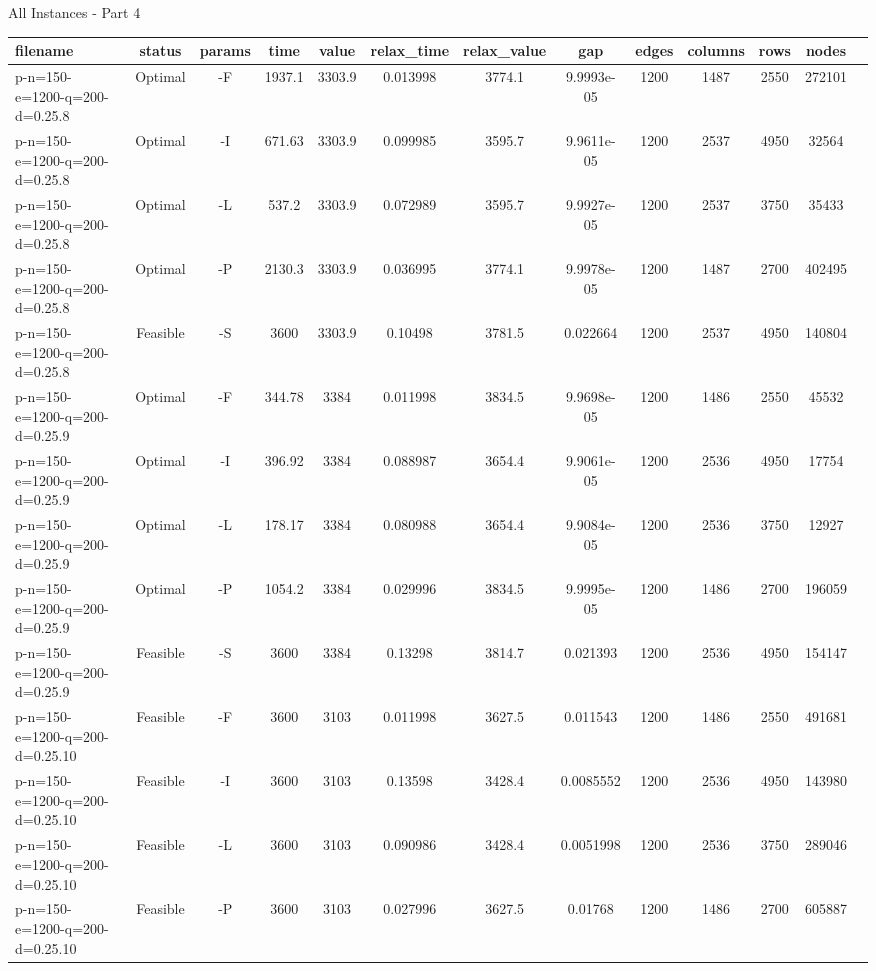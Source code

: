 \documentclass[landscape, a4paper]{article}
\begin{document}
\begin{center}
All Instances - Part 4

\begin{tabular}{lcccccccccccc}
filename & status & params & time & value & relax\_time & relax\_value & gap & edges & columns & rows & nodes & \\
\hline
p-n=150-e=1200-q=200-d=0.25.8 & Optimal & -F & 1937.1 & 3303.9 & 0.013998 & 3774.1 & 9.9993e-05 & 1200 & 1487 & 2550 & 272101 & \\
p-n=150-e=1200-q=200-d=0.25.8 & Optimal & -I & 671.63 & 3303.9 & 0.099985 & 3595.7 & 9.9611e-05 & 1200 & 2537 & 4950 & 32564 & \\
p-n=150-e=1200-q=200-d=0.25.8 & Optimal & -L & 537.2 & 3303.9 & 0.072989 & 3595.7 & 9.9927e-05 & 1200 & 2537 & 3750 & 35433 & \\
p-n=150-e=1200-q=200-d=0.25.8 & Optimal & -P & 2130.3 & 3303.9 & 0.036995 & 3774.1 & 9.9978e-05 & 1200 & 1487 & 2700 & 402495 & \\
p-n=150-e=1200-q=200-d=0.25.8 & Feasible & -S & 3600 & 3303.9 & 0.10498 & 3781.5 & 0.022664 & 1200 & 2537 & 4950 & 140804 & \\
p-n=150-e=1200-q=200-d=0.25.9 & Optimal & -F & 344.78 & 3384 & 0.011998 & 3834.5 & 9.9698e-05 & 1200 & 1486 & 2550 & 45532 & \\
p-n=150-e=1200-q=200-d=0.25.9 & Optimal & -I & 396.92 & 3384 & 0.088987 & 3654.4 & 9.9061e-05 & 1200 & 2536 & 4950 & 17754 & \\
p-n=150-e=1200-q=200-d=0.25.9 & Optimal & -L & 178.17 & 3384 & 0.080988 & 3654.4 & 9.9084e-05 & 1200 & 2536 & 3750 & 12927 & \\
p-n=150-e=1200-q=200-d=0.25.9 & Optimal & -P & 1054.2 & 3384 & 0.029996 & 3834.5 & 9.9995e-05 & 1200 & 1486 & 2700 & 196059 & \\
p-n=150-e=1200-q=200-d=0.25.9 & Feasible & -S & 3600 & 3384 & 0.13298 & 3814.7 & 0.021393 & 1200 & 2536 & 4950 & 154147 & \\
p-n=150-e=1200-q=200-d=0.25.10 & Feasible & -F & 3600 & 3103 & 0.011998 & 3627.5 & 0.011543 & 1200 & 1486 & 2550 & 491681 & \\
p-n=150-e=1200-q=200-d=0.25.10 & Feasible & -I & 3600 & 3103 & 0.13598 & 3428.4 & 0.0085552 & 1200 & 2536 & 4950 & 143980 & \\
p-n=150-e=1200-q=200-d=0.25.10 & Feasible & -L & 3600 & 3103 & 0.090986 & 3428.4 & 0.0051998 & 1200 & 2536 & 3750 & 289046 & \\
p-n=150-e=1200-q=200-d=0.25.10 & Feasible & -P & 3600 & 3103 & 0.027996 & 3627.5 & 0.01768 & 1200 & 1486 & 2700 & 605887 & \\

\end{tabular}
\end{center}
\end{document}
